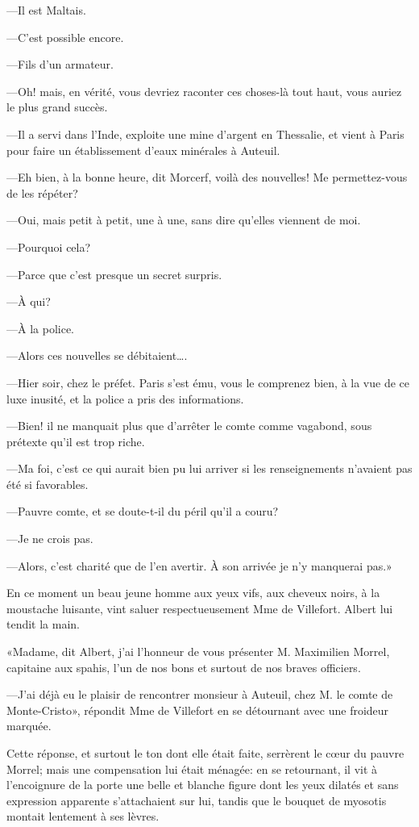 —Il est Maltais. 

—C'est possible encore. 

—Fils d'un armateur. 

—Oh! mais, en vérité, vous devriez raconter ces choses-là tout haut, vous auriez le plus grand succès. 

—Il a servi dans l'Inde, exploite une mine d'argent en Thessalie, et vient à Paris pour faire un établissement d'eaux minérales à Auteuil. 

—Eh bien, à la bonne heure, dit Morcerf, voilà des nouvelles! Me permettez-vous de les répéter? 

—Oui, mais petit à petit, une à une, sans dire qu'elles viennent de moi. 

—Pourquoi cela?  

—Parce que c'est presque un secret surpris. 

—À qui? 

—À la police. 

—Alors ces nouvelles se débitaient\dots. 

—Hier soir, chez le préfet. Paris s'est ému, vous le comprenez bien, à la vue de ce luxe inusité, et la police a pris des informations. 

—Bien! il ne manquait plus que d'arrêter le comte comme vagabond, sous prétexte qu'il est trop riche. 

—Ma foi, c'est ce qui aurait bien pu lui arriver si les renseignements n'avaient pas été si favorables. 

—Pauvre comte, et se doute-t-il du péril qu'il a couru? 

—Je ne crois pas. 

—Alors, c'est charité que de l'en avertir. À son arrivée je n'y manquerai pas.» 

En ce moment un beau jeune homme aux yeux vifs, aux cheveux noirs, à la moustache luisante, vint saluer respectueusement Mme de Villefort. Albert lui tendit la main. 

«Madame, dit Albert, j'ai l'honneur de vous présenter M. Maximilien Morrel, capitaine aux spahis, l'un de nos bons et surtout de nos braves officiers. 

—J'ai déjà eu le plaisir de rencontrer monsieur à Auteuil, chez M. le comte de Monte-Cristo», répondit Mme de Villefort en se détournant avec une froideur marquée. 

Cette réponse, et surtout le ton dont elle était faite, serrèrent le cœur du pauvre Morrel; mais une compensation lui était ménagée: en se retournant, il vit à l'encoignure de la porte une belle et blanche figure dont les yeux dilatés et sans expression apparente s'attachaient sur lui, tandis que le bouquet de myosotis montait lentement à ses lèvres. 

